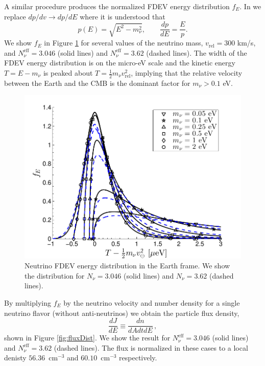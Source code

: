 A similar procedure produces the normalized FDEV energy distribution $f_E$.  In  we replace $dp/dv\to dp/dE$ where it is understood that 
\begin{equation}
p(E)=\sqrt{E^2-m_\nu^2},\qquad \frac{dp}{dE}=\frac{E}{p}.
\end{equation}
We show $f_E$ in Figure \ref{fig:EDist300}  for several values of the neutrino mass, $v_{\text{rel}}=300$ km/s, and $N_\nu^{\mathrm{eff}}=3.046$ (solid lines) and $N_\nu^{\mathrm{eff}}=3.62$ (dashed lines). The width of the FDEV energy distribution is on the micro-eV scale and the kinetic energy $T=E-m_\nu$ is peaked about $T=\frac{1}{2}m_\nu v_{\text{rel}}^2$, implying that the relative velocity between the Earth and the CMB is the dominant factor for $m_\nu>0.1$ eV.

\begin{figure}
\centerline{\includegraphics[width=0.9\linewidth]{04-birrell/NeutrinoDistributionToday/Figures/E_dist_300.pdf}}
\caption{Neutrino FDEV energy distribution in the Earth frame. We show the distribution for $N_\nu=3.046$ (solid lines) and $N_\nu=3.62$ (dashed lines). }
\label{fig:EDist300}
 \end{figure}

By multiplying $f_E$ by the neutrino velocity and number density for a single neutrino flavor (without anti-neutrinos) we obtain the particle flux density,
 \begin{equation}
 \frac{dJ}{dE}\equiv\frac{dn}{dAdtdE}\,,
\end{equation} 
shown in Figure \ref{fig:fluxDist}. We show the result for $N_\nu^{\mathrm{eff}}=3.046$ (solid lines) and $N_\nu^{\mathrm{eff}}=3.62$ (dashed lines). The flux is normalized in these cases to a local denisty $56.36$~cm${}^{-3}$ and $60.10$~cm${}^{-3}$ respectively. 

